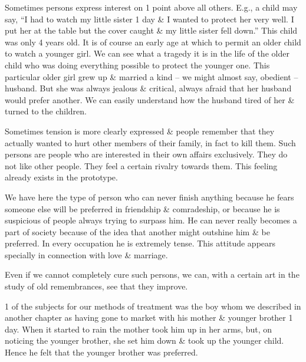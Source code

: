 \documentclass{article}
\numberwithin{equation}{section}
\begin{document}
Sometimes persons express interest on 1 point above all others. E.g., a child may say, ``I had to watch my little sister 1 day \& I wanted to protect her very well. I put her at the table but the cover caught \& my little sister fell down.'' This child was only 4 years old. It is of course an early age at which to permit an older child to watch a younger girl. We can see what a tragedy it is in the life of the older child who was doing everything possible to protect the younger one. This particular older girl grew up \& married a kind -- we might almost say, obedient -- husband. But she was always jealous \& critical, always afraid that her husband would prefer another. We can easily understand how the husband tired of her \& turned to the children.

Sometimes tension is more clearly expressed \& people remember that they actually wanted to hurt other members of their family, in fact to kill them. Such persons are people who are interested in their own affairs exclusively. They do not like other people. They feel a certain rivalry towards them. This feeling already exists in the prototype.

We have here the type of person who can never finish anything because he fears someone else will be preferred in friendship \& comradeship, or because he is suspicious of people always trying to surpass him. He can never really becomes a part of society because of the idea that another might outshine him \& be preferred. In every occupation he is extremely tense. This attitude appears specially in connection with love \& marriage.

Even if we cannot completely cure such persons, we can, with a certain art in the study of old remembrances, see that they improve.

1 of the subjects for our methods of treatment was the boy whom we described in another chapter as having gone to market with his mother \& younger brother 1 day. When it started to rain the mother took him up in her arms, but, on noticing the younger brother, she set him down \& took up the younger child. Hence he felt that the younger brother was preferred.
\end{document}
